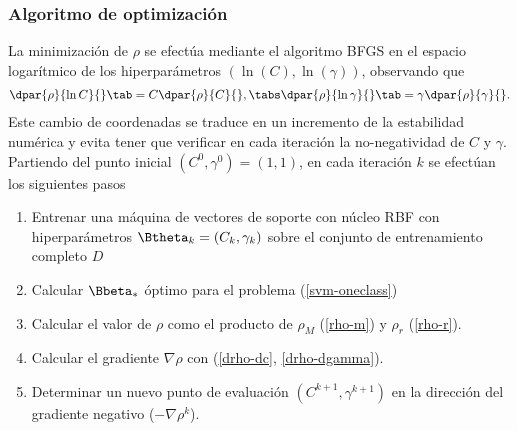 %
\subsubsection{Algoritmo de optimización}
%
La minimización de $\rho$ se efectúa mediante el algoritmo BFGS
\cite{nocedal} en el espacio logarítmico de los hiperparámetros
$(\ln(C),\ln(\gamma))$, observando que
%
\begin{align}
  \dpar{\rho}{\ln C}{}\tab= C \dpar{\rho}{C}{}, \tabs
  \dpar{\rho}{\ln \gamma}{}\tab= \gamma \dpar{\rho}{\gamma}{}.
\end{align}
%
Este cambio de coordenadas se traduce en un incremento de la
estabilidad numérica y evita tener que verificar en cada iteración la
no-negatividad de $C$ y $\gamma$.
Partiendo del punto inicial $(C^0,\gamma^0)=(1,1)$, en cada iteración
$k$ se efectúan los siguientes pasos
%
\begin{enumerate}
\item Entrenar una máquina de vectores de soporte con núcleo RBF
  con hiperparámetros $\Btheta_k=(C_k,\gamma_k)$ sobre el conjunto
  de entrenamiento completo $D$
\item Calcular $\Bbeta_*$ óptimo para el problema (\ref{svm-oneclass})
\item Calcular el valor de $\rho$ como el producto de $\rho_M$
  (\ref{rho-m}) y $\rho_r$ (\ref{rho-r}).
\item Calcular el gradiente $\nabla\rho$ con (\ref{drho-dc},
  \ref{drho-dgamma}).
\item Determinar un nuevo punto de evaluación $(C^{k+1},\gamma^{k+1})$
  en la dirección del gradiente negativo ($-\nabla\rho^k$).
\end{enumerate}
%
